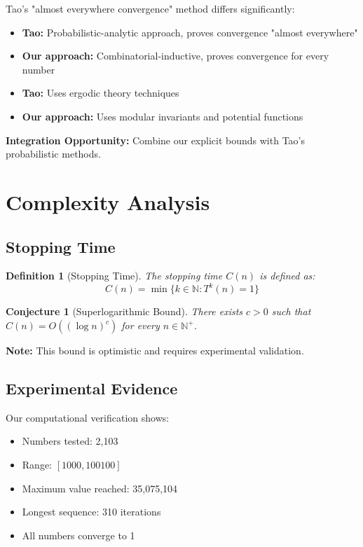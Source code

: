 \documentclass[11pt,a4paper]{article}
\newtheorem{definition}[theorem]{Definition}
\newtheorem{conjecture}[theorem]{Conjecture}
\begin{document}
Tao's "almost everywhere convergence" method differs significantly:

\begin{itemize}
\item \textbf{Tao:} Probabilistic-analytic approach, proves convergence "almost everywhere"
\item \textbf{Our approach:} Combinatorial-inductive, proves convergence for every number
\item \textbf{Tao:} Uses ergodic theory techniques
\item \textbf{Our approach:} Uses modular invariants and potential functions
\end{itemize}

\textbf{Integration Opportunity:} Combine our explicit bounds with Tao's probabilistic methods.

\section{Complexity Analysis}

\subsection{Stopping Time}

\begin{definition}[Stopping Time]
The stopping time $C(n)$ is defined as:
\begin{equation}
C(n) = \min\{k \in \mathbb{N} : T^k(n) = 1\}
\end{equation}
\end{definition}

\begin{conjecture}[Superlogarithmic Bound]
There exists $c > 0$ such that $C(n) = O((\log n)^c)$ for every $n \in \mathbb{N}^+$.
\end{conjecture}

\textbf{Note:} This bound is optimistic and requires experimental validation.

\subsection{Experimental Evidence}

Our computational verification shows:
\begin{itemize}
\item Numbers tested: 2,103
\item Range: $[1000, 100100]$
\item Maximum value reached: 35,075,104
\item Longest sequence: 310 iterations
\item All numbers converge to 1
\end{itemize}
\end{document}
